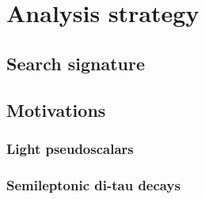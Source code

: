 \chapter{Analysis strategy\label{sec:strategy}}

\section{Search signature\label{sec:signature}}

\section{Motivations\label{sec:motivations}}

\subsection{Light pseudoscalars\label{sec:lighta}}

\subsection{Semileptonic di-tau decays\label{sec:semileptonic}}